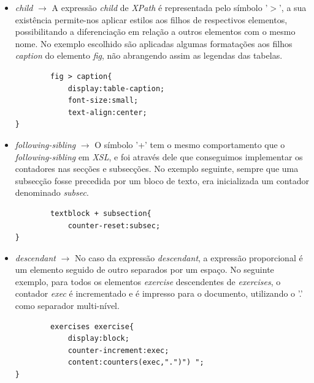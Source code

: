 \documentclass[a4paper]{article}
\begin{document}
\begin{itemize}
        \item \emph{child} $\rightarrow$ A expressão \emph{child} de \emph{XPath} é representada pelo símbolo '$>$', a sua existência permite-nos aplicar estilos aos filhos de respectivos elementos, possibilitando a diferenciação em relação a outros elementos com o mesmo nome. No exemplo escolhido são aplicadas algumas formatações aos filhos \emph{caption} do elemento \emph{fig}, não abrangendo assim as legendas das tabelas.\\
        
        \begin{small}
        \begin{lstlisting}
        fig > caption{
            display:table-caption;
            font-size:small;
            text-align:center;
}
        \end{lstlisting}
        \end{small}
        
        \item \emph{following-sibling} $\rightarrow$ O símbolo '+' tem o mesmo comportamento que o \emph{following-sibling} em \emph{XSL}, e foi através dele que conseguimos implementar os contadores nas secções e subsecções. No exemplo seguinte, sempre que uma subsecção fosse precedida por um bloco de texto, era inicializada um contador denominado \emph{subsec}.\\
             
        \begin{small}
        \begin{lstlisting}
        textblock + subsection{
            counter-reset:subsec;
}
        \end{lstlisting}
        \end{small}
        
        \item \emph{descendant} $\rightarrow$ No caso da expressão \emph{descendant}, a expressão proporcional é um elemento seguido de outro separados por um espaço. No seguinte exemplo, para todos os elementos \emph{exercise} descendentes de \emph{exercises}, o contador \emph{exec} é incrementado e é impresso para o documento, utilizando o '.' como separador multi-nível.\\
        
        \begin{small}
        \begin{lstlisting}
        exercises exercise{
            display:block;
            counter-increment:exec;
            content:counters(exec,".")") ";
}
        \end{lstlisting}
        \end{small}
\end{itemize}                            
                        
\end{document}
